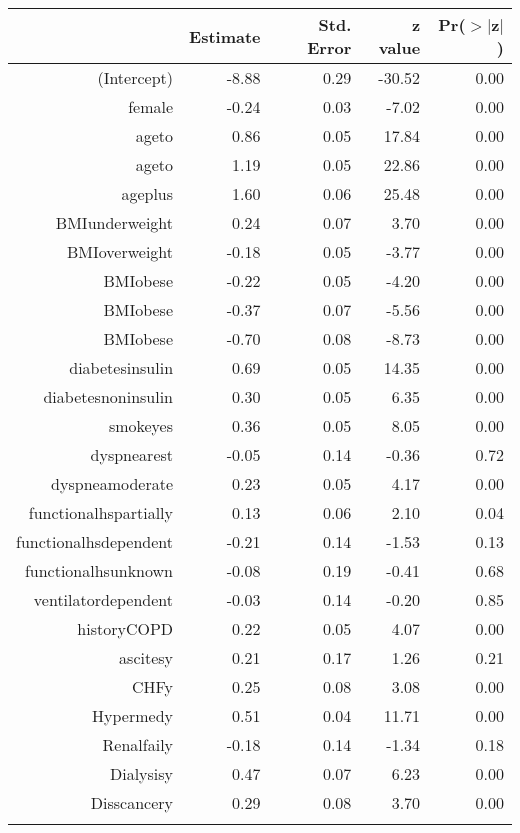 \bigskip\bigskip
\centering
\begin{tabular}{rrrrr}
  \hline
 & Estimate & Std. Error & z value & Pr($>$$|$z$|$) \\ 
  \hline
(Intercept) & -8.88 & 0.29 & -30.52 & 0.00 \\ 
  female & -0.24 & 0.03 & -7.02 & 0.00 \\ 
  age\-65\-to\-74 & 0.86 & 0.05 & 17.84 & 0.00 \\ 
  age\-75\-to\-84 & 1.19 & 0.05 & 22.86 & 0.00 \\ 
  age\-85\-plus & 1.60 & 0.06 & 25.48 & 0.00 \\ 
  BMI\-underweight & 0.24 & 0.07 & 3.70 & 0.00 \\ 
  BMI\-overweight & -0.18 & 0.05 & -3.77 & 0.00 \\ 
  BMI\-obese\-1 & -0.22 & 0.05 & -4.20 & 0.00 \\ 
  BMI\-obese\-2 & -0.37 & 0.07 & -5.56 & 0.00 \\ 
  BMI\-obese\-3 & -0.70 & 0.08 & -8.73 & 0.00 \\ 
  diabetes\-insulin & 0.69 & 0.05 & 14.35 & 0.00 \\ 
  diabetes\-noninsulin & 0.30 & 0.05 & 6.35 & 0.00 \\ 
  smoke\-yes & 0.36 & 0.05 & 8.05 & 0.00 \\ 
  dyspnea\-rest & -0.05 & 0.14 & -0.36 & 0.72 \\ 
  dyspnea\-moderate & 0.23 & 0.05 & 4.17 & 0.00 \\ 
  functional\-hs\-partially & 0.13 & 0.06 & 2.10 & 0.04 \\ 
  functional\-hs\-dependent & -0.21 & 0.14 & -1.53 & 0.13 \\ 
  functional\-hs\-unknown & -0.08 & 0.19 & -0.41 & 0.68 \\ 
  ventilator\-dependent & -0.03 & 0.14 & -0.20 & 0.85 \\ 
  history\-COPD & 0.22 & 0.05 & 4.07 & 0.00 \\ 
  ascites\-y & 0.21 & 0.17 & 1.26 & 0.21 \\ 
  CHF\-y & 0.25 & 0.08 & 3.08 & 0.00 \\ 
  Hyper\-med\-y & 0.51 & 0.04 & 11.71 & 0.00 \\ 
  Renal\-fail\-y & -0.18 & 0.14 & -1.34 & 0.18 \\ 
  Dialysis\-y & 0.47 & 0.07 & 6.23 & 0.00 \\ 
  Diss\-cancer\-y & 0.29 & 0.08 & 3.70 & 0.00 \\ 
$$
\end{tabular}

